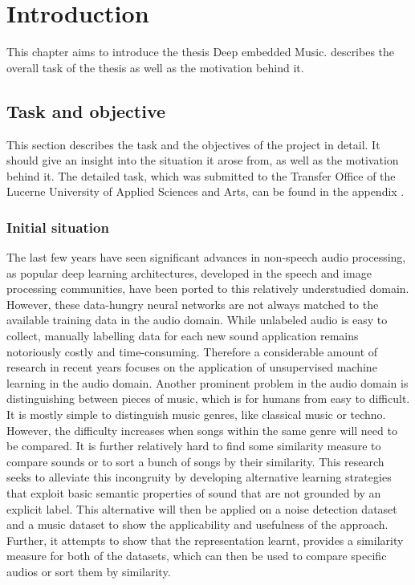 \chapter{Introduction}
\label{ch:Introduction}
This chapter aims to introduce the thesis \flqq Deep embedded Music\frqq.  describes the overall task of the thesis as well as the motivation behind it.

\section{Task and objective}
\label{sec:Task-Objective}
This section describes the task and the objectives of the project in detail. It should give an insight into the situation it arose from, as well as the motivation behind it. The detailed task, which was submitted to the Transfer Office of the Lucerne University of Applied Sciences and Arts, can be found in the appendix .

\subsection{Initial situation}
\label{sub:Initial-Stituation}
The last few years have seen significant advances in non-speech audio processing, as popular deep learning architectures, developed in the speech and image processing communities, have been ported to this relatively understudied domain. However, these data-hungry neural networks are not always matched to the available training data in the audio domain. While unlabeled audio is easy to collect, manually labelling data for each new sound application remains notoriously costly and time-consuming. Therefore a considerable amount of research in recent years focuses on the application of unsupervised machine learning in the audio domain.
\newline
\newline
Another prominent problem in the audio domain is distinguishing between pieces of music, which is for humans from easy to difficult. It is mostly simple to distinguish music genres, like classical music or techno. However, the difficulty increases when songs within the same genre will need to be compared. It is further relatively hard to find some similarity measure to compare sounds or to sort a bunch of songs by their similarity.
\newline
\newline
This research seeks to alleviate this incongruity by developing alternative learning strategies that exploit basic semantic properties of sound that are not grounded by an explicit label. This alternative will then be applied on a noise detection dataset and a music dataset to show the applicability and usefulness of the approach. Further, it attempts to show that the representation learnt, provides a similarity measure for both of the datasets, which can then be used to compare specific audios or sort them by similarity.

